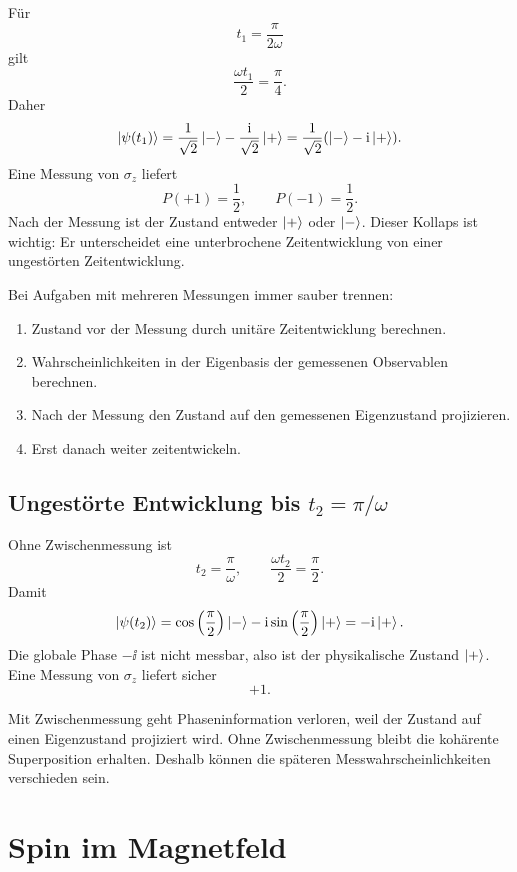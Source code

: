 Für
\[
    t_1=\frac{\pi}{2\omega}
\]
gilt
\[
    \frac{\omega t_1}{2}=\frac{\pi}{4}.
\]
Daher
\[
    \left|\psi(t_1)\right\rangle
    =\frac{1}{\sqrt2}\left|-\right\rangle
    -\frac{\mathrm{i}}{\sqrt2}\left|+\right\rangle
    =\frac{1}{\sqrt2}(\left|-\right\rangle-\mathrm{i}\left|+\right\rangle).
\]
Eine Messung von \(\sigma_z\) liefert
\[
    P(+1)=\frac12,
    \qquad
    P(-1)=\frac12.
\]
Nach der Messung ist der Zustand entweder \(\left|+\right\rangle\) oder \(\left|-\right\rangle\). Dieser Kollaps ist wichtig: Er unterscheidet eine unterbrochene Zeitentwicklung von einer ungestörten Zeitentwicklung.

\begin{examtipbox}
Bei Aufgaben mit mehreren Messungen immer sauber trennen:
\begin{enumerate}
    \item Zustand vor der Messung durch unitäre Zeitentwicklung berechnen.
    \item Wahrscheinlichkeiten in der Eigenbasis der gemessenen Observablen berechnen.
    \item Nach der Messung den Zustand auf den gemessenen Eigenzustand projizieren.
    \item Erst danach weiter zeitentwickeln.
\end{enumerate}
\end{examtipbox}

\subsection{Ungestörte Entwicklung bis \(t_2=\pi/\omega\)}

Ohne Zwischenmessung ist
\[
    t_2=\frac{\pi}{\omega},
    \qquad
    \frac{\omega t_2}{2}=\frac{\pi}{2}.
\]
Damit
\[
    \left|\psi(t_2)\right\rangle
    =\cos\left(\frac{\pi}{2}\right)\left|-\right\rangle
    -\mathrm{i}\sin\left(\frac{\pi}{2}\right)\left|+\right\rangle
    =-\mathrm{i}\left|+\right\rangle.
\]
Die globale Phase \(-\ii\) ist nicht messbar, also ist der physikalische Zustand \(\left|+\right\rangle\). Eine Messung von \(\sigma_z\) liefert sicher
\[
    +1.
\]

\begin{conceptbox}
Mit Zwischenmessung geht Phaseninformation verloren, weil der Zustand auf einen Eigenzustand projiziert wird. Ohne Zwischenmessung bleibt die kohärente Superposition erhalten. Deshalb können die späteren Messwahrscheinlichkeiten verschieden sein.
\end{conceptbox}

\section{Spin im Magnetfeld}

